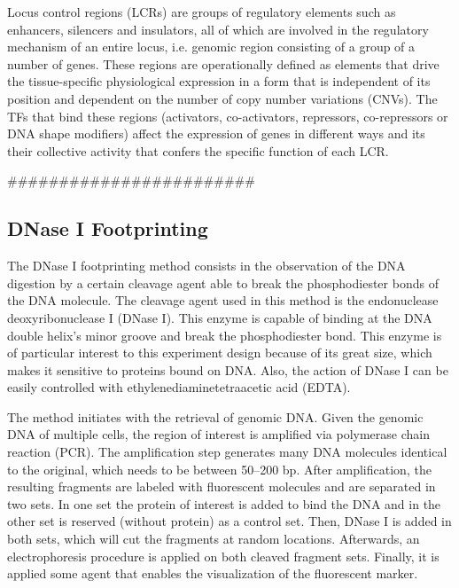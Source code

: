 Locus control regions (LCRs) are groups of regulatory elements such as enhancers, silencers and insulators, all of which are involved in the regulatory mechanism of an entire locus, i.e. genomic region consisting of a group of a number of genes. These regions are operationally defined as elements that drive the tissue-specific physiological expression in a form that is independent of its position and dependent on the number of copy number variations (CNVs). The TFs that bind these regions (activators, co-activators, repressors, co-repressors or DNA shape modifiers) affect the expression of genes in different ways and its their collective activity that confers the specific function of each LCR.





########################






\subsection{DNase I Footprinting}
\label{sec:dnase.i.footprinting}

The DNase I footprinting method consists in the observation of the DNA digestion by a certain cleavage agent able to break the phosphodiester bonds of the DNA molecule. The cleavage agent used in this method is the endonuclease deoxyribonuclease I (DNase I). This enzyme is capable of binding at the DNA double helix's minor groove and break the phosphodiester bond. This enzyme is of particular interest to this experiment design because of its great size, which makes it sensitive to proteins bound on DNA. Also, the action of DNase I can be easily controlled with ethylenediaminetetraacetic acid (EDTA).

The method initiates with the retrieval of genomic DNA. Given the genomic DNA of multiple cells, the region of interest is amplified via polymerase chain reaction (PCR). The amplification step generates many DNA molecules identical to the original, which needs to be between 50--200 bp. After amplification, the resulting fragments are labeled with fluorescent molecules and are separated in two sets. In one set the protein of interest is added to bind the DNA and in the other set is reserved (without protein) as a control set. Then, DNase I is added in both sets, which will cut the fragments at random locations. Afterwards, an electrophoresis procedure is applied on both cleaved fragment sets. Finally, it is applied some agent that enables the visualization of the fluorescent marker.

